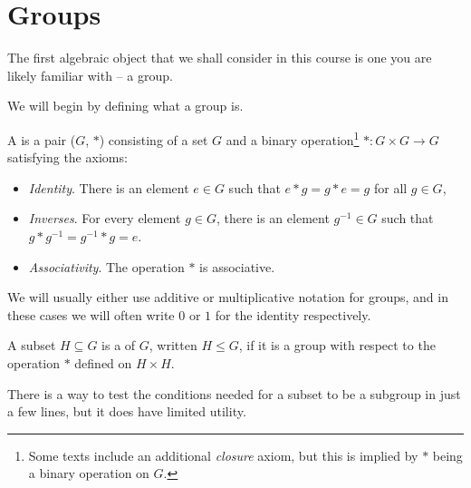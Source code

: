 \documentclass[a4paper]{scrreprt}
\begin{document}




\chapter{Groups}


The first algebraic object that we shall consider in this course is one you are likely familiar with -- a group. 


We will begin by defining what a group is.

\begin{definition}[Group]
	A  is a pair ($G$, $*$) consisting of a set $G$ and a binary operation\footnote{Some texts include an additional \emph{closure} axiom, but this is implied by $*$ being a binary operation on $G$.} $* : G \times G \rightarrow G$ satisfying the axioms:
	\begin{itemize}
		\item \emph{Identity}. There is an element $e \in G$ such that $e * g = g * e = g$ for all $g \in G$,
		\item \emph{Inverses}. For every element $g \in G$, there is an element $g^{-1} \in G$ such that $g * g^{-1} = g^{-1} * g = e$.
		\item \emph{Associativity}. The operation $*$ is associative.
	\end{itemize}
\end{definition}

\begin{remark}
	We will usually either use additive or multiplicative notation for groups, and in these cases we will often write $0$ or $1$ for the identity respectively.
\end{remark}

\begin{definition}[Subgroup]
	A subset $H \subseteq G$ is a  of $G$, written $H \leq G$, if it is a group with respect to the operation $*$ defined on $H \times H$.
\end{definition}

There is a way to test the conditions needed for a subset to be a subgroup in just a few lines, but it does have limited utility.
\end{document}
